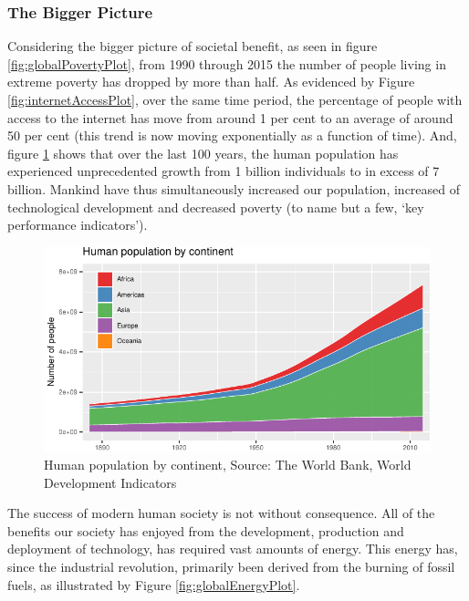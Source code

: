 \documentclass[11pt,]{article}
\begin{document}
\hypertarget{the-bigger-picture}{%
\subsubsection{The Bigger Picture}\label{the-bigger-picture}}

Considering the bigger picture of societal benefit, as seen in figure
\ref{fig:globalPovertyPlot}, from 1990 through 2015 the number of people
living in extreme poverty has dropped by more than half. As evidenced by
Figure \ref{fig:internetAccessPlot}, over the same time period, the
percentage of people with access to the internet has move from around 1
per cent to an average of around 50 per cent (this trend is now moving
exponentially as a function of time). And, figure
\ref{fig:populationGrowthPlot} shows that over the last 100 years, the
human population has experienced unprecedented growth from 1 billion
individuals to in excess of 7 billion. Mankind have thus simultaneously
increased our population, increased of technological development and
decreased poverty (to name but a few, `key performance indicators').

\begin{figure}[H]

{\centering \includegraphics{MD_Final_files/figure-latex/populationGrowthPlot-1} 

}

\caption{Human population by continent, Source: The World Bank, World Development Indicators}\label{fig:populationGrowthPlot}
\end{figure}

The success of modern human society is not without consequence. All of
the benefits our society has enjoyed from the development, production
and deployment of technology, has required vast amounts of energy. This
energy has, since the industrial revolution, primarily been derived from
the burning of fossil fuels, as illustrated by Figure
\ref{fig:globalEnergyPlot}.
\end{document}
